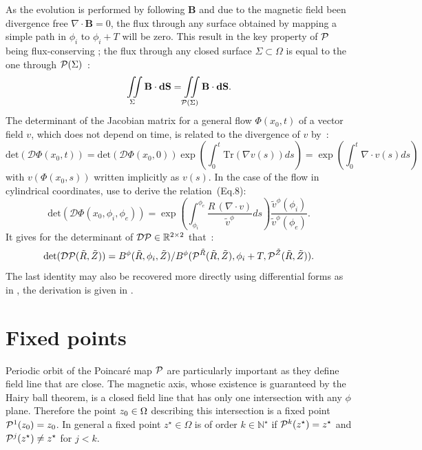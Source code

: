 As the evolution is performed by following $\mathbf{B}$ and due to the magnetic field been divergence free $\nabla\cdot\textbf{B} = 0$, the flux through any surface obtained by mapping a simple path in $\phi_i$ to $\phi_i + T$ will be zero. This result in the key property of $\mathcal{P}$ being flux-conserving ; the flux through any closed surface $\Sigma \subset \Omega$ is equal to the one through $\mathcal{P}(\Sigma)$~:
\begin{equation*}
    \iint\limits_{\Sigma}\textbf{B}\cdot\textbf{dS} = \iint\limits_{\mathcal{P}(\Sigma)}\textbf{B}\cdot\textbf{dS}.
\end{equation*}
The determinant of the Jacobian matrix for a general flow $\Phi(x_0, t)$ of a vector field $v$, which does not depend on time, is related to the divergence of $v$ \cite[p.408]{hirsch_differential_2013} by~:
\begin{equation}\label{eq:det-div-flow}
    \text{det}(\mathcal{D}\Phi(x_0, t)) = \text{det}(\mathcal{D}\Phi(x_0, 0))\exp\left(\int_0^t\text{Tr}(\nabla v(s)) ds\right) = \exp\left(\int_0^t \nabla\cdot v(s) ds\right)
\end{equation}
with $v(\Phi(x_0, s))$ written implicitly as $v(s)$. In the case of the flow in cylindrical coordinates, \citeauthor{wei_invariant_2023} use  to derive the relation~(Eq.8):
\begin{equation*}\label{eq:det-div-pmap}
    \text{det}(\mathcal{D}\Phi(x_0, \phi_i, \phi_e)) = \exp\left(\int_{\phi_i}^{\phi_e} \frac{R\,(\nabla\cdot v)}{\tilde{v}^\phi} ds\right)\frac{\tilde{v}^\phi(\phi_i)}{\tilde{v}^\phi(\phi_e)}.
\end{equation*}
It gives for the determinant of $\mathcal{D}\mathcal{P} \in \mathbb{R}^{2\times2}$ that~:
\begin{equation}\label{eq:pmap-det}
    \text{det}(\mathcal{D}\mathcal{P}(\tilde{R}, \tilde{Z})) = B^\phi(\tilde{R},\phi_i, \tilde{Z})/B^\phi(\mathcal{P}^{\tilde{R}}(\tilde{R},\tilde{Z}), \phi_i+T,\mathcal{P}^{\tilde{Z}}(\tilde{R},\tilde{Z})).
\end{equation}
The last identity may also be recovered more directly using differential forms as in \cite{meiss_thirty_2015}, the derivation is given in .

\section{Fixed points}
Periodic orbit of the Poincaré map $\mathcal{P}$ are particularly important as they define field line that are close. The magnetic axis, whose existence is guaranteed by the Hairy ball theorem, is a closed field line that has only one intersection with any $\phi$ plane. Therefore the point $z_0\in\Omega$ describing this intersection is a fixed point $\mathcal{P}^1(z_0) = z_0$. In general a fixed point $z^\star\in\Omega$ is of order $k\in\mathbb{N}^\star$ if $\mathcal{P}^k(z^\star) = z^\star$ and $\mathcal{P}^j(z^\star) \neq z^\star$ for $j < k$.

